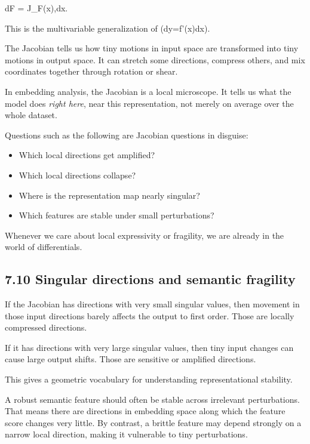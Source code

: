 \documentclass[
]{article}
\providecommand{\tightlist}{%
  \setlength{\itemsep}{0pt}\setlength{\parskip}{0pt}}
\begin{document}
dF = J\_F(x),dx.

This is the multivariable generalization of (dy=f'(x)dx).

The Jacobian tells us how tiny motions in input space are transformed
into tiny motions in output space. It can stretch some directions,
compress others, and mix coordinates together through rotation or shear.

In embedding analysis, the Jacobian is a local microscope. It tells us
what the model does \emph{right here}, near this representation, not
merely on average over the whole dataset.

Questions such as the following are Jacobian questions in disguise:

\begin{itemize}
\tightlist
\item
  Which local directions get amplified?
\item
  Which local directions collapse?
\item
  Where is the representation map nearly singular?
\item
  Which features are stable under small perturbations?
\end{itemize}

Whenever we care about local expressivity or fragility, we are already
in the world of differentials.

\hypertarget{singular-directions-and-semantic-fragility}{%
\subsection{7.10 Singular directions and semantic
fragility}\label{singular-directions-and-semantic-fragility}}

If the Jacobian has directions with very small singular values, then
movement in those input directions barely affects the output to first
order. Those are locally compressed directions.

If it has directions with very large singular values, then tiny input
changes can cause large output shifts. Those are sensitive or amplified
directions.

This gives a geometric vocabulary for understanding representational
stability.

A robust semantic feature should often be stable across irrelevant
perturbations. That means there are directions in embedding space along
which the feature score changes very little. By contrast, a brittle
feature may depend strongly on a narrow local direction, making it
vulnerable to tiny perturbations.
\end{document}
